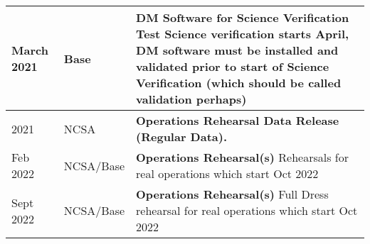 \begin{longtable} {|l|l|p{}|}
March 2021 &  Base &  {\bf DM Software for Science Verification Test}
Science verification starts April, DM software must be installed and validated prior to start of Science Verification (which should be called validation perhaps)
\\ \hline

2021 &  NCSA &  {\bf Operations  Rehearsal Data Release (Regular Data).}
\\ \hline

Feb 2022 &  NCSA/Base &  {\bf Operations  Rehearsal(s)}
Rehearsals for real operations which start Oct 2022
\\ \hline
Sept 2022 &  NCSA/Base &  {\bf Operations  Rehearsal(s)}
Full Dress rehearsal for real operations which start Oct 2022
\\ \hline

\hline

\end{longtable}
